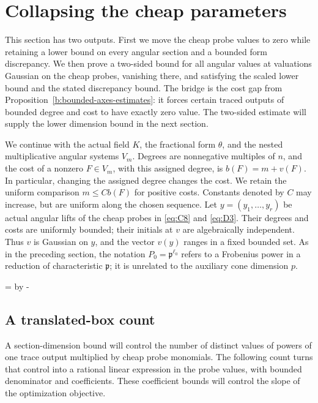 \section{Collapsing the cheap parameters}
\label{c:cheap-section}

This section has two outputs.  First we move the cheap probe values to
zero while retaining a lower bound on every angular section and a bounded
form discrepancy.  We then prove a two-sided bound for all angular
values at valuations Gaussian on the cheap probes, vanishing there,
and satisfying the scaled lower bound and the stated discrepancy bound.
The bridge is the cost gap from
Proposition~\ref{b:bounded-axes-estimates}: it forces certain traced
outputs of bounded degree and cost to have exactly zero value.  The
two-sided estimate will supply the lower dimension bound in the next
section.

We continue with the actual field $K$, the fractional form $\theta$,
and the nested multiplicative angular systems $V_m$.
Degrees are nonnegative multiples of $n$, and the cost of a nonzero
$F\in V_m$, with this assigned degree, is
$b(F)=m+v(F)$.  In particular, changing the assigned degree changes the
cost.  We retain the uniform comparison $m\le Cb(F)$ for positive
costs.  Constants denoted by $C$ may increase, but are uniform along
the chosen sequence.  Let $y=(y_1,\ldots,y_r)$ be actual angular lifts
of the cheap probes in \eqref{eq:C8} and \eqref{eq:D3}.  Their degrees
and costs are uniformly bounded; their initials at $v$ are algebraically
independent.  Thus $v$ is Gaussian on $y$, and the vector $v(y)$ ranges
in a fixed bounded set.  As in the preceding section, the notation
$P_0=\mathfrak p^{\ell_0}$ refers to a Frobenius power in a reduction
of characteristic $\mathfrak p$; it is unrelated to the auxiliary
cone dimension $p$.

\par
\begingroup
  =\pagegoal
  \advance{} by -\pagetotal
  \ifdim\dimen0<7\baselineskip
    \newpage
  \fi
\endgroup
\subsection{A translated-box count}

A section-dimension bound will control the number of distinct values of
powers of one trace output multiplied by cheap probe monomials.  The
following count turns that control into a rational linear expression in
the probe values, with bounded denominator and coefficients.  These
coefficient bounds will control the slope of the optimization objective.

